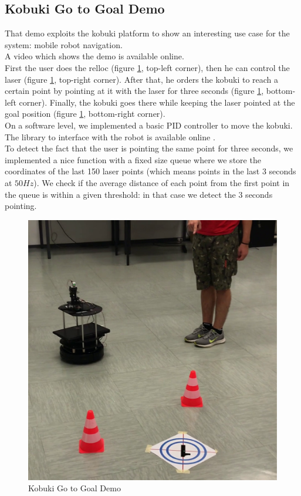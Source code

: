 \subsection{Kobuki Go to Goal Demo}\label{subs:kobukiGoToGoal}
That demo exploits the kobuki platform to show an interesting use case for the system: mobile robot navigation.\\
A video which shows the demo is available online.\\
First the user does the relloc (figure \ref{fig:goToGoalDemo}, top-left corner), then he can control the laser (figure \ref{fig:goToGoalDemo}, top-right corner). After that, he orders the kobuki to reach a certain point by pointing at it with the laser for three seconds (figure \ref{fig:goToGoalDemo}, bottom-left corner). Finally, the kobuki goes there while keeping the laser pointed at the goal position (figure \ref{fig:goToGoalDemo}, bottom-right corner).\\
On a software level, we implemented a basic PID controller to move the kobuki. The library to interface with the robot is available online \cite{kobuki:ROS}.\\ To detect the fact that the user is pointing the same point for three seconds, we implemented a nice function with a fixed size queue where we store the coordinates of the last 150 laser points (which means points in the last $3$ seconds at $50Hz$). We check if the average distance of each point from the first point in the queue is within a given threshold: in that case we detect the 3 seconds pointing.\\
\begin{figure}
	\centering
	\includegraphics[width=\textwidth]{img/goToGoalDemo.png}%
	\caption{Kobuki Go to Goal Demo}
	\label{fig:goToGoalDemo}
\end{figure}

